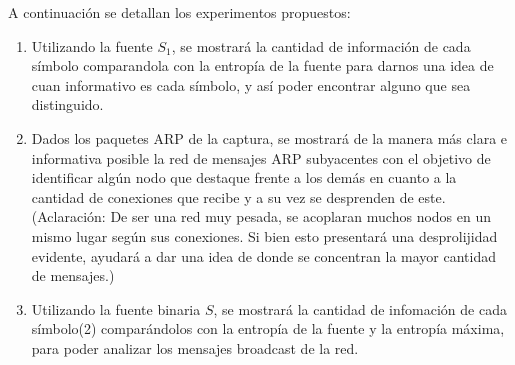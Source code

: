 A continuación se detallan los experimentos propuestos:

\begin{enumerate}

	\item Utilizando la fuente $S_1$, se mostrará la cantidad de información de cada símbolo comparandola con la entropía de la fuente para darnos una idea de cuan informativo es cada símbolo, y así poder encontrar alguno que sea distinguido.
	\item Dados los paquetes ARP de la captura, se mostrará de la manera más clara e informativa posible la red de mensajes ARP subyacentes con el objetivo de identificar algún nodo que destaque frente a los demás en cuanto a la cantidad de conexiones que recibe y a su vez se desprenden de este. (Aclaración: De ser una red muy pesada, se acoplaran muchos nodos en un mismo lugar según sus conexiones. Si bien esto presentará una desprolijidad evidente, ayudará a dar una idea de donde se concentran la mayor cantidad de mensajes.)
	\item Utilizando la fuente binaria $S$, se mostrará la cantidad de infomación de cada símbolo(2) comparándolos con la entropía de la fuente y la entropía máxima, para poder analizar los mensajes broadcast de la red. 

\end{enumerate}